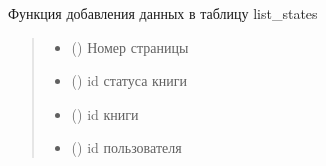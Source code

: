 \documentclass[letterpaper,10pt,russian]{sphinxmanual}
\begin{document}
\begin{fulllineitems}
\begin{fulllineitems}
\label{\detokenize{database.sqlite3_interface.tables:database.sqlite3_interface.tables.list_states.ListStates.insert_get_data}}
\pysigstartsignatures
{}
\pysigstopsignatures
\sphinxAtStartPar
Функция добавления данных в таблицу list\_states
\begin{quote}\begin{description}
\begin{itemize}
\item {} 
\sphinxAtStartPar
{} () \textendash{} Номер страницы

\item {} 
\sphinxAtStartPar
{} () \textendash{} id статуса книги

\item {} 
\sphinxAtStartPar
{} () \textendash{} id книги

\item {} 
\sphinxAtStartPar
{} () \textendash{} id пользователя

\end{itemize}

\end{description}\end{quote}
\begin{description}
\begin{sphinxVerbatim}[commandchars=\\\{\}]
\end{sphinxVerbatim}


\end{description}
\end{fulllineitems}
\end{fulllineitems}
\end{document}
